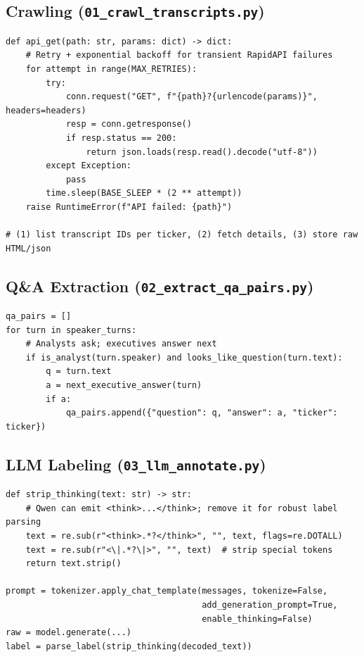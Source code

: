 \documentclass[12pt]{article}
\begin{document}
\subsection*{Crawling (\texttt{01\_crawl\_transcripts.py})}
\begin{lstlisting}[caption={Robust API GET with retry + saving transcript HTML.}]
def api_get(path: str, params: dict) -> dict:
    # Retry + exponential backoff for transient RapidAPI failures
    for attempt in range(MAX_RETRIES):
        try:
            conn.request("GET", f"{path}?{urlencode(params)}", headers=headers)
            resp = conn.getresponse()
            if resp.status == 200:
                return json.loads(resp.read().decode("utf-8"))
        except Exception:
            pass
        time.sleep(BASE_SLEEP * (2 ** attempt))
    raise RuntimeError(f"API failed: {path}")

# (1) list transcript IDs per ticker, (2) fetch details, (3) store raw HTML/json
\end{lstlisting}

\subsection*{Q\&A Extraction (\texttt{02\_extract\_qa\_pairs.py})}
\begin{lstlisting}[caption={Locate Q\&A section and pair analyst question -> executive answer.}]
qa_pairs = []
for turn in speaker_turns:
    # Analysts ask; executives answer next
    if is_analyst(turn.speaker) and looks_like_question(turn.text):
        q = turn.text
        a = next_executive_answer(turn)
        if a:
            qa_pairs.append({"question": q, "answer": a, "ticker": ticker})
\end{lstlisting}

\subsection*{LLM Labeling (\texttt{03\_llm\_annotate.py})}
\begin{lstlisting}[caption={Prevent ``thinking'' leakage and parse a 3-class label.}]
def strip_thinking(text: str) -> str:
    # Qwen can emit <think>...</think>; remove it for robust label parsing
    text = re.sub(r"<think>.*?</think>", "", text, flags=re.DOTALL)
    text = re.sub(r"<\|.*?\|>", "", text)  # strip special tokens
    return text.strip()

prompt = tokenizer.apply_chat_template(messages, tokenize=False,
                                       add_generation_prompt=True,
                                       enable_thinking=False)
raw = model.generate(...)
label = parse_label(strip_thinking(decoded_text))
\end{lstlisting}
\end{document}

